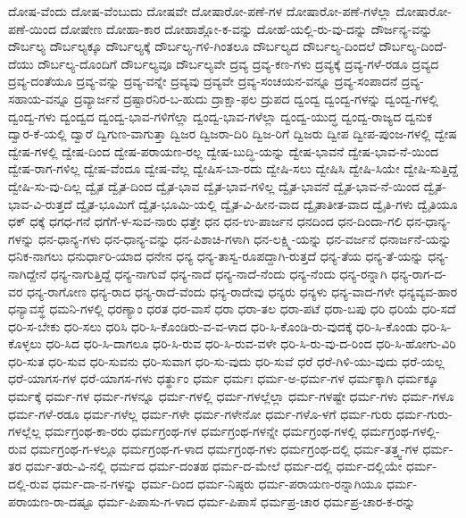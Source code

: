 {ದೋಷ-ವೆಂದು
ದೋಷ-ವೆಂಬುದು
ದೋಷವೇ
ದೋಷಾರೋ-ಪಣೆ-ಗಳ
ದೋಷಾರೋ-ಪಣೆ-ಗಳೆಲ್ಲಾ
ದೋಷಾರೋ-ಪಣೆ-ಯಿಂದ
ದೋಷೇಣ
ದೋಹಾ-ಕಾರ
ದೋಹಾಶ್ಲೋ-ಕ-ವನ್ನು
ದೋಹೆ-ಯಲ್ಲಿ-ರು-ವು-ದನ್ನು
ದೌರ್ಜನ್ಯ-ವನ್ನು
ದೌರ್ಬಲ್ಯ
ದೌರ್ಬಲ್ಯಕ್ಕೂ
ದೌರ್ಬಲ್ಯಕ್ಕೆ
ದೌರ್ಬಲ್ಯ-ಗಳಿ-ಗಿಂತಲೂ
ದೌರ್ಬಲ್ಯದ
ದೌರ್ಬಲ್ಯ-ದಿಂದಲೆ
ದೌರ್ಬಲ್ಯ-ದಿಂದೆ-ದೆಯು
ದೌರ್ಬಲ್ಯ-ದೊಂದಿಗೆ
ದೌರ್ಬಲ್ಯವೂ
ದೌರ್ಬಲ್ಯವೇ
ದ್ರವ್ಯ
ದ್ರವ್ಯ-ಕಣ-ಗಳು
ದ್ರವ್ಯಕ್ಕೆ
ದ್ರವ್ಯ-ಗಳೆ-ರಡೂ
ದ್ರವ್ಯದ
ದ್ರವ್ಯ-ದಂತೆಯೂ
ದ್ರವ್ಯ-ವನ್ನು
ದ್ರವ್ಯ-ವನ್ನೇ
ದ್ರವ್ಯವು
ದ್ರವ್ಯವೇ
ದ್ರವ್ಯ-ಸಂಚಯನ-ವನ್ನೂ
ದ್ರವ್ಯ-ಸಂಪಾದನೆ
ದ್ರವ್ಯ-ಸಹಾಯ-ವನ್ನೂ
ದ್ರವ್ಯಾರ್ಜನೆ
ದ್ರಷ್ಟಾರನಿರ-ಬ-ಹುದು
ದ್ರಾಕ್ಷಾ-ಫಲ
ದ್ರುಪದ
ದ್ವಂದ್ವ
ದ್ವಂದ್ವ-ಗಳನ್ನು
ದ್ವಂದ್ವ-ಗಳಲ್ಲಿ
ದ್ವಂದ್ವ-ಗಳು
ದ್ವಂದ್ವದ
ದ್ವಂದ್ವ-ಭಾವ-ಗಳಿಗೆಲ್ಲಾ
ದ್ವಂದ್ವ-ಭಾವ-ಗಳೆಲ್ಲಾ
ದ್ವಂದ್ವ-ಯುದ್ಧ
ದ್ವಂದ್ವ-ರಾಜ್ಯದ
ದ್ವನುಕ
ದ್ವಾರ-ಕೆ-ಯಲ್ಲಿ
ದ್ವಾರೆ
ದ್ವಿಗುಣ-ವಾಗುತ್ತಾ
ದ್ವಿಜರ
ದ್ವಿಜರಾ-ದಿರಿ
ದ್ವಿಜ-ರಿಗೆ
ದ್ವಿಜರು
ದ್ವೀಪ
ದ್ವೀಪ-ಪುಂಜ-ಗಳಲ್ಲಿ
ದ್ವೇಷ
ದ್ವೇಷ-ಗಳಲ್ಲಿ
ದ್ವೇಷ-ದಿಂದ
ದ್ವೇಷ-ಪರಾಯಣ-ರಲ್ಲ
ದ್ವೇಷ-ಬುದ್ಧಿ-ಯನ್ನು
ದ್ವೇಷ-ಭಾವನೆ
ದ್ವೇಷ-ಭಾವ-ನೆ-ಯಿಂದ
ದ್ವೇಷ-ರಾಗ-ಗಳಿಲ್ಲ
ದ್ವೇಷ-ವೆಂದೂ
ದ್ವೇಷ-ವೆಲ್ಲ
ದ್ವೇಷಿಸ-ಬಾ-ರದು
ದ್ವೇಷಿ-ಸಲು
ದ್ವೇಷಿಸಿ
ದ್ವೇಷಿ-ಸಿಯೇ
ದ್ವೇಷಿ-ಸುತ್ತಿದ್ದೆ
ದ್ವೇಷಿ-ಸು-ವು-ದಿಲ್ಲ
ದ್ವೈತ
ದ್ವೈತ-ದಿಂದ
ದ್ವೈತ-ಭಾವ
ದ್ವೈತ-ಭಾವ-ಗಳಿಲ್ಲ
ದ್ವೈತ-ಭಾವನೆ
ದ್ವೈತ-ಭಾವ-ನೆ-ಯಿಂದ
ದ್ವೈತ-ಭಾವ-ವಿ-ರುತ್ತದೆ
ದ್ವೈತ-ಭೂಮಿಗೆ
ದ್ವೈತ-ಭೂಮಿ-ಯಲ್ಲಿ
ದ್ವೈತ-ವಿ-ಹೀನ-ವಾದ
ದ್ವೈತಾತೀತ-ವಾದ
ದ್ವೈತಿ-ಗಳು
ದ್ವೈತಿಯೂ
ಧಕ್
ಧಕ್ಕೆ
ಧಗಧ-ಗನೆ
ಧಗೆಗೆ-ಳ-ಸುವ-ನಾರು
ಧತ್ತೇ
ಧನ
ಧನ-ಉ-ಪಾರ್ಜನ
ಧನದಿಂದ
ಧನ-ದಿಂದಾ-ಗಲಿ
ಧನ-ಧಾನ್ಯ-ಗಳನ್ನು
ಧನ-ಧಾನ್ಯ-ಗಳು
ಧನ-ಧಾನ್ಯ-ವನ್ನು
ಧನ-ಪಿಶಾಚಿ-ಗಳಾಗಿ
ಧನ-ಲಕ್ಷ್ಮಿ-ಯನ್ನು
ಧನ-ವರ್ಜನೆ
ಧನಾರ್ಜನೆ-ಯನ್ನು
ಧನಿಕ-ನಾಗಲು
ಧನುರ್ಧಾರಿ-ಯಾದ
ಧನೇನ
ಧನ್ಯ
ಧನ್ಯ-ತಾಸ್ವ-ರೂಪದ್ದಾಗಿ-ರುತ್ತದೆ
ಧನ್ಯ-ತೆಯ
ಧನ್ಯ-ತೆ-ಯನ್ನು
ಧನ್ಯ-ನಾಗಿದ್ದೇನೆ
ಧನ್ಯ-ನಾಗುತ್ತಿದ್ದೆ
ಧನ್ಯ-ನಾಗುವೆ
ಧನ್ಯ-ನಾದೆ
ಧನ್ಯ-ನಾದೆ-ನೆಂದು
ಧನ್ಯ-ನೆಂದು
ಧನ್ಯ-ರನ್ನಾಗಿ
ಧನ್ಯ-ರಾಗ-ದ-ವರ
ಧನ್ಯ-ರಾಗೋಣ
ಧನ್ಯ-ರಾದ
ಧನ್ಯ-ರಾದೆ-ವೆಂದು
ಧನ್ಯ-ರಾದೇವು
ಧನ್ಯರು
ಧನ್ಯಳು
ಧನ್ಯ-ವಾದ-ಗಳೇ
ಧನ್ಯವ್ಯವ-ಹಾರ
ಧನ್ಯಾವಸ್ಥೆ
ಧಮನಿ-ಗಳಲ್ಲಿ
ಧರಣ್ಯಾಂ
ಧರತ
ಧರ-ವಾಸೆ
ಧರಾ
ಧರಾ-ತಲ
ಧರಾ-ಪಟೆ
ಧರಾ-ಬಪು
ಧರಿ
ಧರಿಯೆ
ಧರಿ-ಸದೆ
ಧರಿ-ಸ-ಬೇಕು
ಧರಿ-ಸಲು
ಧರಿಸಿ
ಧರಿ-ಸಿ-ಕೊಂಡಿರು-ವ-ವ-ಳಾದ
ಧರಿ-ಸಿ-ಕೊಂಡಿ-ರು-ವುದಕ್ಕೆ
ಧರಿ-ಸಿ-ಕೊಂಡು
ಧರಿ-ಸಿ-ಕೊಳ್ಳಲು
ಧರಿ-ಸಿದ
ಧರಿ-ಸಿ-ದಾಗಲೂ
ಧರಿ-ಸಿ-ರುವ
ಧರಿ-ಸಿ-ರುವ-ವಳೇ
ಧರಿ-ಸಿ-ರು-ವು-ದ-ರಿಂದ
ಧರಿ-ಸಿ-ಹೋಗು-ವಿರಿ
ಧರಿ-ಸುತ
ಧರಿ-ಸುವ
ಧರಿ-ಸುವನು
ಧರಿ-ಸುವಾಗ
ಧರಿ-ಸು-ವುದು
ಧರಿ-ಸುವೆ
ಧರೆ
ಧರೆ-ಗಿಳಿ-ಯು-ವುದು
ಧರೆ-ಯಲ್ಲ
ಧರೆ-ಯಾಗಸ-ಗಳ
ಧರೆ-ಯಾಗಸ-ಗಳು
ಧರ್ತ್ಥುಂ
ಧರ್ಮ
ಧರ್ಮಃ
ಧರ್ಮ-ಅ-ಧರ್ಮ-ಗಳ
ಧರ್ಮಕ್ಕಾಗಿ
ಧರ್ಮಕ್ಕೂ
ಧರ್ಮಕ್ಕೆ
ಧರ್ಮ-ಗಳ
ಧರ್ಮ-ಗಳನ್ನೂ
ಧರ್ಮ-ಗಳಲ್ಲಿ
ಧರ್ಮ-ಗಳಲ್ಲೆಲ್ಲಾ
ಧರ್ಮ-ಗಳಷ್ಟೇ
ಧರ್ಮ-ಗಳು
ಧರ್ಮ-ಗಳೂ
ಧರ್ಮ-ಗಳೆ-ರಡೂ
ಧರ್ಮ-ಗಳೆಲ್ಲ
ಧರ್ಮ-ಗಳೇ
ಧರ್ಮ-ಗಳೇನೋ
ಧರ್ಮ-ಗಳೊ-ಳಗೆ
ಧರ್ಮ-ಗುರು
ಧರ್ಮ-ಗುರು-ಗಳಲ್ಲೆಲ್ಲ
ಧರ್ಮಗ್ರಂಥ-ಕಾ-ರರು
ಧರ್ಮಗ್ರಂಥ-ಗಳ
ಧರ್ಮಗ್ರಂಥ-ಗಳನ್ನೇ
ಧರ್ಮಗ್ರಂಥ-ಗಳಲ್ಲಿ
ಧರ್ಮಗ್ರಂಥ-ಗಳಲ್ಲಿ-ರುವ
ಧರ್ಮಗ್ರಂಥ-ಗ-ಳಲ್ಲೂ
ಧರ್ಮಗ್ರಂಥ-ಗ-ಳಾದ
ಧರ್ಮಗ್ರಂಥ-ಗಳು
ಧರ್ಮಗ್ರಂಥ-ದಲ್ಲಿ
ಧರ್ಮ-ತತ್ತ್ವ-ಗಳ
ಧರ್ಮ-ತರ
ಧರ್ಮ-ತರು-ವಿ-ನಲ್ಲಿ
ಧರ್ಮದ
ಧರ್ಮ-ದಂತಹ
ಧರ್ಮ-ದ-ಮೇಲೆ
ಧರ್ಮ-ದಲ್ಲಿ
ಧರ್ಮ-ದಲ್ಲಿಯೇ
ಧರ್ಮ-ದಲ್ಲಿ-ರುವ
ಧರ್ಮ-ದಾ-ನ-ಗಳನ್ನು
ಧರ್ಮ-ದಿಂದ
ಧರ್ಮ-ನಿಷ್ಠರು
ಧರ್ಮ-ಪರಾಯಣ-ರನ್ನಾಗಿಯೂ
ಧರ್ಮ-ಪರಾಯಣ-ರಾ-ದಷ್ಟೂ
ಧರ್ಮ-ಪಿಪಾಸು-ಗ-ಳಾದ
ಧರ್ಮ-ಪಿಪಾಸೆ
ಧರ್ಮಪ್ರ-ಚಾರ
ಧರ್ಮಪ್ರ-ಚಾರ-ಕ-ರನ್ನು
}
